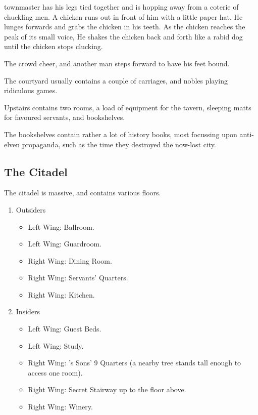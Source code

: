 \begin{multicols}{2}
\begin{boxtext}
	\Gls{townmaster} has his legs tied together and is hopping away from a coterie of chuckling men.
	 A chicken runs out in front of him with a little paper hat.
	 He lunges forwards and grabs the chicken in his teeth.
	 As the chicken reaches the peak of its small voice, He shakes the chicken back and forth like a rabid dog until the chicken stops clucking.

	The crowd cheer, and another man steps forward to have his feet bound.

\end{boxtext}

The courtyard usually contains a couple of carriages, and nobles playing ridiculous games.



Upstairs contains two rooms, a load of equipment for the tavern, sleeping matts for favoured servants, and bookshelves.

The bookshelves contain rather a lot of history books, most focussing upon anti-elven propaganda, such as the time they destroyed the now-lost city.
 
\subsection{The Citadel}\label{citadel}
The citadel is massive, and contains various floors.

\begin{enumerate}

	\item{Outsiders}
		\begin{itemize}
			\item{Left Wing: Ballroom.}
			\item{Left Wing: Guardroom.}
			\item{Right Wing: Dining Room.}
			\item{Right Wing: Servants' Quarters.}
			\item{Right Wing: Kitchen.}
		\end{itemize}
	\item{Insiders}
		\begin{itemize}
			\item{Left Wing: Guest Beds.}
			\item{Left Wing: Study.}
			\item{Right Wing: 's Sons' 9 Quarters (a nearby tree stands tall enough to access one room).}
			\item{Right Wing: Secret Stairway up to the floor above.}
			\item{Right Wing: Winery.}
		\end{itemize}


\end{enumerate}
\end{multicols}
